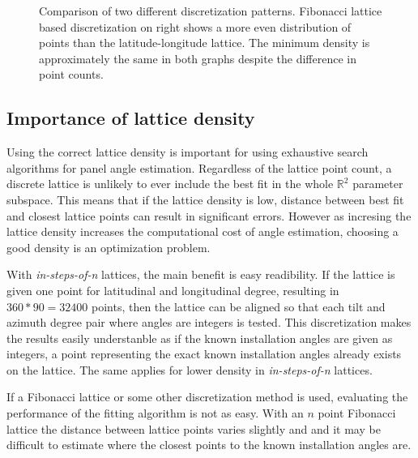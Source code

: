 \begin{figure}
\caption{Comparison of two different discretization patterns. Fibonacci lattice based discretization on right shows a more even distribution of points than the latitude-longitude lattice. The minimum density is approximately the same in both graphs despite the difference in point counts.}
     \label{fig_5stepfibolat}
\end{figure}

\newpage
\subsection{Importance of lattice density}\label{ss_lattice_density}
Using the correct lattice density is important for using exhaustive search algorithms for panel angle estimation. Regardless of the lattice point count, a discrete lattice is unlikely to ever include the best fit in the whole $\mathbb{R}^2$ parameter subspace. This means that if the lattice density is low, distance between best fit and closest lattice points can result in significant errors. However as incresing the lattice density increases the computational cost of angle estimation, choosing a good density is an optimization problem.

With \textit{in-steps-of-n} lattices, the main benefit is easy readibility. If the lattice is given one point for latitudinal and longitudinal degree, resulting in $360*90=32400$ points, then the lattice can be aligned so that each tilt and azimuth degree pair where angles are integers is tested. This discretization makes the results easily understanble as if the known installation angles are given as integers, a point representing the exact known installation angles already exists on the lattice. The same applies for lower density in \textit{in-steps-of-n} lattices.

If a Fibonacci lattice or some other discretization method is used, evaluating the performance of the fitting algorithm is not as easy. With an $n$ point Fibonacci lattice the distance between lattice points varies slightly and and it may be difficult to estimate where the closest points to the known installation angles are.





